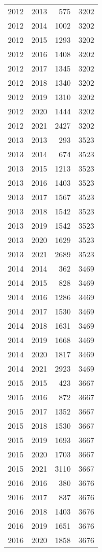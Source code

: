 \documentclass[
  11pt,
  letterpaper,
  DIV=11,
  numbers=noendperiod,
  twoside]{scrartcl}
\begin{document}
\begin{longtable}[]{@{}rrrr@{}}
2012 & 2013 & 575 & 3202 \\
2012 & 2014 & 1002 & 3202 \\
2012 & 2015 & 1293 & 3202 \\
2012 & 2016 & 1408 & 3202 \\
2012 & 2017 & 1345 & 3202 \\
2012 & 2018 & 1340 & 3202 \\
2012 & 2019 & 1310 & 3202 \\
2012 & 2020 & 1444 & 3202 \\
2012 & 2021 & 2427 & 3202 \\
2013 & 2013 & 293 & 3523 \\
2013 & 2014 & 674 & 3523 \\
2013 & 2015 & 1213 & 3523 \\
2013 & 2016 & 1403 & 3523 \\
2013 & 2017 & 1567 & 3523 \\
2013 & 2018 & 1542 & 3523 \\
2013 & 2019 & 1542 & 3523 \\
2013 & 2020 & 1629 & 3523 \\
2013 & 2021 & 2689 & 3523 \\
2014 & 2014 & 362 & 3469 \\
2014 & 2015 & 828 & 3469 \\
2014 & 2016 & 1286 & 3469 \\
2014 & 2017 & 1530 & 3469 \\
2014 & 2018 & 1631 & 3469 \\
2014 & 2019 & 1668 & 3469 \\
2014 & 2020 & 1817 & 3469 \\
2014 & 2021 & 2923 & 3469 \\
2015 & 2015 & 423 & 3667 \\
2015 & 2016 & 872 & 3667 \\
2015 & 2017 & 1352 & 3667 \\
2015 & 2018 & 1530 & 3667 \\
2015 & 2019 & 1693 & 3667 \\
2015 & 2020 & 1703 & 3667 \\
2015 & 2021 & 3110 & 3667 \\
2016 & 2016 & 380 & 3676 \\
2016 & 2017 & 837 & 3676 \\
2016 & 2018 & 1403 & 3676 \\
2016 & 2019 & 1651 & 3676 \\
2016 & 2020 & 1858 & 3676 \\

\end{longtable}
\end{document}
